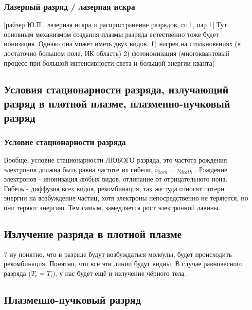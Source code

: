 \documentclass[10pt, a4paper]{article}
\begin{document}
\subsubsection{Лазерный разряд / лазерная искра}
[райзер Ю.П., лазерная искра и распространение разрядов, гл 1, пар 1]
Тут основным механизмом создания плазмы разряда естественно тоже будет ионизация. Однако она может иметь двух видов. 1) нагрев на столкновениях (в достаточно большом поле, ИК область) 2) фотоионизация (многоквантовый процесс при большой интенсивности света и большой энергии кванта)

\subsection{Условия стационарности разряда, излучающий разряд в плотной плазме, плазменно-пучковый разряд}
\subsubsection{Условие стационарности разряда}

Вообще, условие стационарности ЛЮБОГО разряда,  это частота рождения электронов должна быть равна частоте их гибели. $\nu_{born} = \nu_{death}$ . Рождение электронов - инонизация любых видов, отлипание от отрицательного иона. Гибель - диффузия всех видов, рекомбинация, так же туда относят потери энергии на возбуждение частиц, хотя электроны непосредственно не теряются, но они теряют энергию. Тем самым, замедляется рост электронной лавины. 

\subsection{Излучение разряда в плотной плазме}

?
ну понятно, что в разряде будут возбуждаться молеулы, будет происходить рекомбинация. Понятно, что все эти линии будут видны. В случае равновесного разряда ($T_e = T_i$), у нас будет ещё и излучение чёрного тела.

\subsection{Плазменно-пучковый разряд}
\end{document}
